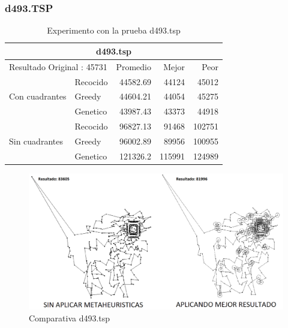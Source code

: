 \subsubsection{d493.TSP}
\begin{table}[hbtp]
 \centering 
	\begin{tabular}{ | l   l | r | r | r |   }
        \hline\multicolumn{5}{|c|}{ \rowcolor[gray]{0.8} d493.tsp} \\\hline
        \multicolumn{2}{|l|}{Resultado Original : 45731} & Promedio & Mejor & Peor \\ \hline
                        & Recocido  & 44582.69 & 44124 & 45012  \\ 
         Con cuadrantes & Greedy    & 44604.21 & 44054 & 45275  \\ 
                        & Genetico  & 43987.43 & 43373 & 44918  \\ \hline
                        & Recocido  & 96827.13 & 91468 & 102751   \\ 
         Sin cuadrantes & Greedy    & 96002.89 & 89956 & 100955   \\ 
                        & Genetico  & 121326.2 & 115991 & 124989    \\ \hline
    \end{tabular}
    \caption{Experimento con la prueba d493.tsp}
    \label{table:EXP_d493.tsp}
\end{table}
\begin{figure}[hbtp]
    \centering
        \includegraphics[width=1\textwidth]{PruebasResultados/Experimentos_Comparativas/d493.png}
        \caption{Comparativa d493.tsp}
        \label{fig:d493_comparativa.png}
\end{figure}
